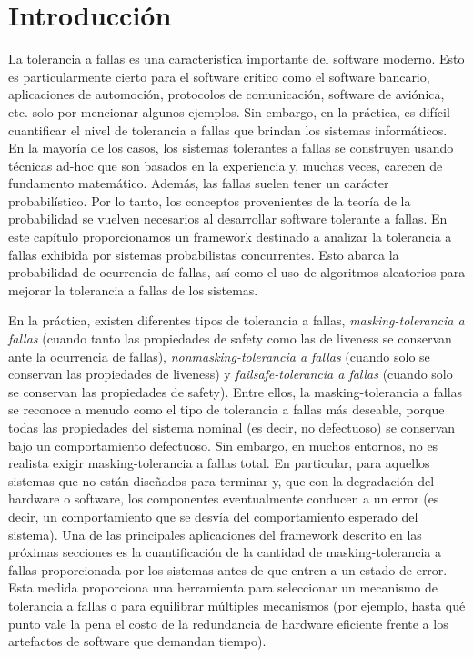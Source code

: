\section{Introducción} \label{sec:intro_prob}

La tolerancia a fallas es una característica importante del software moderno. Esto es particularmente cierto para el software crítico como el software bancario,
aplicaciones de automoción, protocolos de comunicación, software de aviónica, etc.
solo por mencionar algunos ejemplos.
Sin embargo, en la práctica, es difícil cuantificar el nivel de tolerancia a fallas que brindan los sistemas informáticos. En la mayoría de los casos, los sistemas tolerantes a fallas se construyen usando técnicas ad-hoc que son basados en la experiencia y, muchas veces, carecen de fundamento matemático.
Además, las fallas suelen tener un carácter probabilístico. Por lo tanto, los conceptos provenientes de la teoría de la probabilidad se vuelven necesarios al desarrollar software tolerante a fallas. En este capítulo proporcionamos un framework destinado a analizar la tolerancia a fallas exhibida por sistemas probabilistas concurrentes. Esto abarca la probabilidad de ocurrencia de fallas, así como el uso de algoritmos aleatorios para mejorar la tolerancia a fallas de los sistemas.

 En la práctica, existen diferentes tipos de tolerancia a fallas, \emph{masking-tolerancia a fallas} (cuando tanto las propiedades de safety como las de liveness se conservan ante la ocurrencia de fallas),
\emph{nonmasking-tolerancia a fallas} (cuando solo se conservan las propiedades de liveness) y \emph{failsafe-tolerancia a fallas} (cuando solo se conservan las propiedades de safety).
Entre ellos, la masking-tolerancia a fallas se reconoce a menudo como el tipo de tolerancia a fallas más deseable, porque todas las propiedades del sistema nominal (es decir, no defectuoso) se conservan bajo un comportamiento defectuoso.
Sin embargo, en muchos entornos, no es realista exigir masking-tolerancia a fallas total. En particular, para aquellos sistemas que no están diseñados para terminar y, que con la degradación del hardware o software, los componentes
 eventualmente conducen a un error (es decir, un comportamiento que se desvía del comportamiento esperado del sistema). Una de las principales aplicaciones del framework descrito en las próximas secciones es la cuantificación de la
 cantidad de masking-tolerancia a fallas proporcionada por los sistemas antes de que entren a un estado de error. Esta medida proporciona una herramienta para seleccionar un mecanismo de tolerancia a fallas o para equilibrar múltiples mecanismos (por ejemplo, hasta qué punto vale la pena el costo de la redundancia de hardware eficiente frente a los artefactos de software que demandan tiempo).
	
